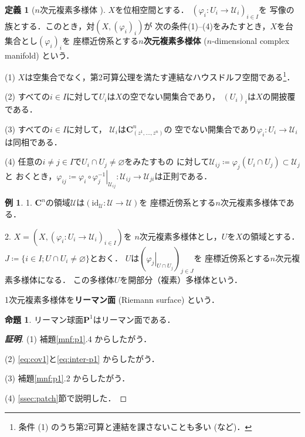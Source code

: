 \documentclass[11pt, a4paper, dvipdfmx]{jsarticle}
\theoremstyle{definition}
\newtheorem{Definition}[Axiom]{定義}
\newtheorem{Proposition}[Axiom]{命題}
\newtheorem{Example}[Axiom]{例}
\newcommand{\cc}{\mathbf{C}}
\newcommand{\pp}{\mathbf{P}}
\newcommand{\mcal}{\mathcal}
\newcommand{\pphi}{\varphi} %
\newcommand{\UU}{\mcal{U}}
\newcommand{\emp}{\varnothing}
\newcommand{\ceq}{\coloneqq}
\newcommand{\sbs}{\subset}
\newcommand{\mapres}[2]{\left. #1 \right|_{#2}}
\newcommand{\id}{\mathrm{id}}
\theoremstyle{mystyle}
\numberwithin{equation}{section} %
\begin{document}
\begin{Definition}[$n$次元複素多様体 {\cite[定義4.1]{ogs}}]
    $X$を位相空間とする．
    $(\pphi_{i}\colon U_{i}\to \UU_{i})_{i\in I}$を
    写像の族とする．このとき，対$(X,(\pphi_{i})_{i})$が
    次の条件(1)--(4)をみたすとき，$X$を台集合とし$(\pphi_{i})_i$を
    座標近傍系とする\textbf{$n$次元複素多様体} ($n$-dimensional complex manifold) という．

    (1) 
    $X$は空集合でなく，第2可算公理を満たす連結なハウスドルフ空間である\footnote{
        条件 (1) のうち第2可算と連結を課さないことも多い (\cite{kobayashi1}など)．}．

    (2) 
    すべての$i\in I$に対して$U_i$は$X$の空でない開集合であり，
    $(U_i)_i$は$X$の開披覆である．

    (3) 
    すべての$i\in I$に対して，
    $\UU_i$は$\cc^{n}_{(z^{1},\dots,z^{n})}$の
    空でない開集合であり$\pphi_{i}\colon U_i\to\UU_i$は同相である．

    (4) 
    任意の$i\neq j \in I$で$U_i\cap U_j \neq \emp$をみたすもの
    に対して$\UU_{ij}\ceq \pphi_j(U_i\cap U_j)\sbs \UU_j$と
    おくとき，$\pphi_{ij}\ceq 
    \mapres{\pphi_{i}\circ\pphi_{j}^{-1}}{\UU_{ij}}
    \colon 
    \UU_{ij}\to\UU_{ji}$は正則である．
\end{Definition}

\begin{Example}\label{ex:openR}
    1. 
    $\cc^n$の領域$\UU$は$(\id_{\UU}\colon\UU\to\UU)$を
    座標近傍系とする$n$次元複素多様体である．

    2. 
    $X=(X, (\pphi_{i}\colon U_{i}\to \UU_{i})_{i\in I})$を
    $n$次元複素多様体とし，$U$を$X$の領域とする．
    $J\coloneqq\{i\in I; U\cap U_i \neq \emp\}$とおく．
    $U$は$(\mapres{\pphi_{j}}{U\cap U_{j}})_{j\in J}$を
    座標近傍系とする$n$次元複素多様体になる．
    この多様体$U$を開部分（複素）多様体という．
\end{Example}

1次元複素多様体を\textbf{リーマン面} (Riemann surface) という．

\begin{Proposition}
    リーマン球面$\pp^1$はリーマン面である．    
\end{Proposition}

\begin{proof}[\bf{証明}]
    (1) 
    補題\ref{mnf:p1}.4 からしたがう．

    (2) 
    \eqref{eq:cov1}と\eqref{eq:inter-p1} からしたがう．

    (3) 
    補題\ref{mnf:p1}.2 からしたがう．

    (4) 
    \ref{ssec:patch}節で説明した．
\end{proof}
\end{document}
